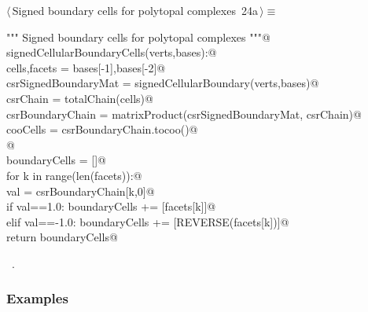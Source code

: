 \documentclass[11pt,oneside]{article}	%
\begin{document}
\begin{flushleft} \small \label{scrap41}
\protect{}$\langle\,$Signed boundary cells for polytopal complexes\nobreak\ {\footnotesize 24a}$\,\rangle\equiv$
\vspace{-1ex}
\begin{list}{}{} \item
\mbox{}\verb@""" Signed boundary cells for polytopal complexes """@\\
\mbox{}\verb@def signedCellularBoundaryCells(verts,bases):@\\
\mbox{}\verb@   cells,facets = bases[-1],bases[-2]@\\
\mbox{}\verb@   csrSignedBoundaryMat = signedCellularBoundary(verts,bases)@\\
\mbox{}\verb@   csrChain = totalChain(cells)@\\
\mbox{}\verb@   csrBoundaryChain = matrixProduct(csrSignedBoundaryMat, csrChain)@\\
\mbox{}\verb@   cooCells = csrBoundaryChain.tocoo()@\\
\mbox{}\verb@   @\\
\mbox{}\verb@   boundaryCells = []@\\
\mbox{}\verb@   for k in range(len(facets)):@\\
\mbox{}\verb@      val = csrBoundaryChain[k,0]@\\
\mbox{}\verb@      if val==1.0: boundaryCells += [facets[k]]@\\
\mbox{}\verb@      elif val==-1.0: boundaryCells += [REVERSE(facets[k])]@\\
\mbox{}\verb@   return boundaryCells@\\
\mbox{}\verb@@{\NWsep}
\end{list}
\vspace{-1ex}
\footnotesize\addtolength{\baselineskip}{-1ex}
\begin{list}{}{\setlength{\itemsep}{-\parsep}\setlength{\itemindent}{-\leftmargin}}
\item \NWtxtMacroRefIn\ .
\end{list}
\end{flushleft}

\subsubsection{Examples}
\end{document}
